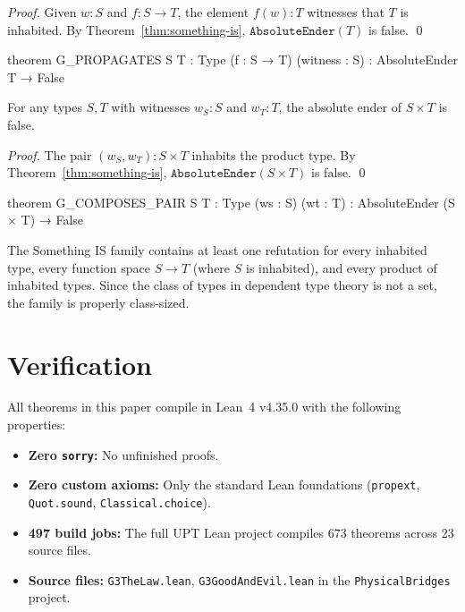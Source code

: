 \begin{proof}
Given $w : S$ and $f : S \to T$, the element $f(w) : T$ witnesses that $T$ is inhabited. By Theorem~\ref{thm:something-is}, $\texttt{AbsoluteEnder}(T)$ is false. \qed
\end{proof}

\begin{leancode}
theorem G_PROPAGATES {S T : Type} (f : S → T) (witness : S) :
    AbsoluteEnder T → False
\end{leancode}

\begin{theorem}\label{thm:product}
For any types $S, T$ with witnesses $w_S : S$ and $w_T : T$, the absolute ender of $S \times T$ is false.
\end{theorem}

\begin{proof}
The pair $(w_S, w_T) : S \times T$ inhabits the product type. By Theorem~\ref{thm:something-is}, $\texttt{AbsoluteEnder}(S \times T)$ is false. \qed
\end{proof}

\begin{leancode}
theorem G_COMPOSES_PAIR {S T : Type} (ws : S) (wt : T) :
    AbsoluteEnder (S × T) → False
\end{leancode}

\begin{corollary}\label{cor:cardinality}
The Something IS family contains at least one refutation for every inhabited type, every function space $S \to T$ (where $S$ is inhabited), and every product of inhabited types. Since the class of types in dependent type theory is not a set, the family is properly class-sized.
\end{corollary}

\section{Verification}

All theorems in this paper compile in Lean~4 v4.35.0 with the following properties:
\begin{itemize}
\item \textbf{Zero \texttt{sorry}:} No unfinished proofs.
\item \textbf{Zero custom axioms:} Only the standard Lean foundations (\texttt{propext}, \texttt{Quot.sound}, \texttt{Classical.choice}).
\item \textbf{497 build jobs:} The full UPT Lean project compiles 673 theorems across 23 source files.
\item \textbf{Source files:} \texttt{G3TheLaw.lean}, \texttt{G3GoodAndEvil.lean} in the \texttt{PhysicalBridges} project.
\end{itemize}

